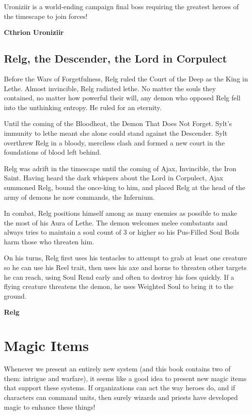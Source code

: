 \documentclass[10pt,a4paper,twoside,bg=print,twocolumn,openany,nodeprecatedcode]{dndbook}
\begin{document}
Uroniziir is a world-ending campaign final boss requiring the greatest heroes of the timescape to join forces!

\textbf{Cthrion Uroniziir}

\subsection{Relg, the Descender, the Lord in Corpulect}
Before the Wars of Forgetfulness, Relg ruled the Court of the Deep as the King in Lethe. Almost invincible, Relg radiated lethe. No matter the souls they contained, no matter how powerful their will, any demon who opposed Relg fell into the unthinking entropy. He ruled for an eternity.

Until the coming of the Bloodheat, the Demon That Does Not Forget. Sylt's immunity to lethe meant she alone could stand against the Descender. Sylt overthrew Relg in a bloody, merciless clash and formed a new court in the foundations of blood left behind.

Relg was adrift in the timescape until the coming of Ajax, Invincible, the Iron Saint. Having heard the dark whispers about the Lord in Corpulect, Ajax summoned Relg, bound the once-king to him, and placed Relg at the head of the army of demons he now commands, the Infernium.

In combat, Relg positions himself among as many enemies as possible to make the most of his Aura of Lethe. The demon welcomes melee combatants and always tries to maintain a soul count of 3 or higher so his Pus-Filled Soul Boils harm those who threaten him.

On his turns, Relg first uses his tentacles to attempt to grab at least one creature so he can use his Reel trait, then uses his axe and horns to threaten other targets he can reach, using Soul Rend early and often to destroy his foes quickly. If a flying creature threatens the demon, he uses Weighted Soul to bring it to the ground.

\textbf{Relg}

\section{Magic Items}
Whenever we present an entirely new system (and this book contains two of them: intrigue and warfare), it seems like a good idea to present new magic items that support these systems. If organizations can act the way heroes do, and if characters can command units, then surely wizards and priests have developed magic to enhance these things!
\end{document}
